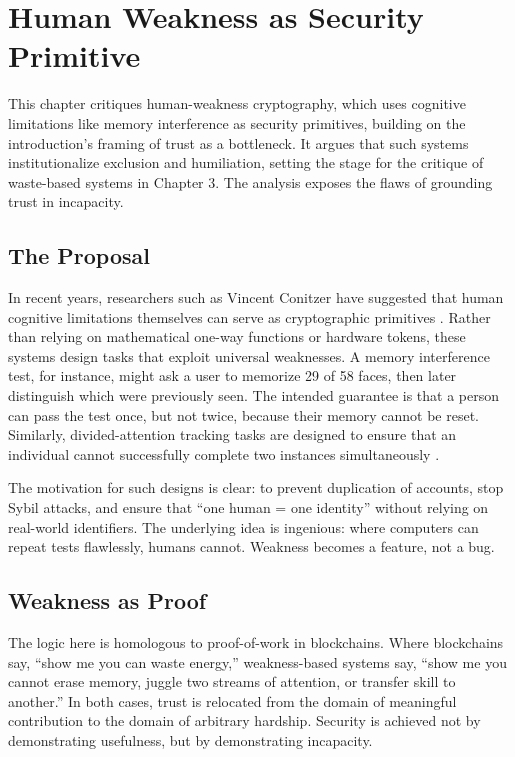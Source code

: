 \documentclass[openany]{book}
\begin{document}
\chapter{Human Weakness as Security Primitive}

This chapter critiques human-weakness cryptography, which uses cognitive limitations like memory interference as security primitives, building on the introduction’s framing of trust as a bottleneck. It argues that such systems institutionalize exclusion and humiliation, setting the stage for the critique of waste-based systems in Chapter 3. The analysis exposes the flaws of grounding trust in incapacity.

\section{The Proposal}

In recent years, researchers such as Vincent Conitzer have suggested that human cognitive limitations themselves can serve as cryptographic primitives \cite{conitzer2020}. Rather than relying on mathematical one-way functions or hardware tokens, these systems design tasks that exploit universal weaknesses. A memory interference test, for instance, might ask a user to memorize 29 of 58 faces, then later distinguish which were previously seen. The intended guarantee is that a person can pass the test once, but not twice, because their memory cannot be reset. Similarly, divided-attention tracking tasks are designed to ensure that an individual cannot successfully complete two instances simultaneously \cite{eriksen1985,mccormick1990,jans2010}.

The motivation for such designs is clear: to prevent duplication of accounts, stop Sybil attacks, and ensure that ``one human = one identity'' without relying on real-world identifiers. The underlying idea is ingenious: where computers can repeat tests flawlessly, humans cannot. Weakness becomes a feature, not a bug.

\section{Weakness as Proof}

The logic here is homologous to proof-of-work in blockchains. Where blockchains say, ``show me you can waste energy,'' weakness-based systems say, ``show me you cannot erase memory, juggle two streams of attention, or transfer skill to another.'' In both cases, trust is relocated from the domain of meaningful contribution to the domain of arbitrary hardship. Security is achieved not by demonstrating usefulness, but by demonstrating incapacity.
\end{document}

